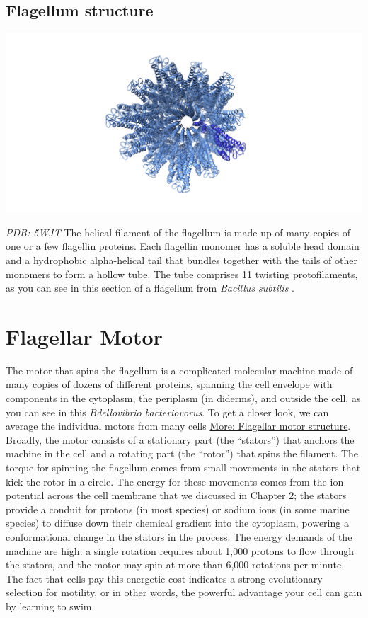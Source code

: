 \documentclass[]{tufte-book}
\begin{document}
\subsection{Flagellum structure}\label{Flagellum_structure}

\includegraphics{img/schematics/6_1_1}

\emph{PDB: 5WJT} The helical filament of the flagellum is made up of
many copies of one or a few flagellin proteins. Each flagellin monomer
has a soluble head domain and a hydrophobic alpha-helical tail that
bundles together with the tails of other monomers to form a hollow tube.
The tube comprises 11 twisting protofilaments, as you can see in this
section of a flagellum from \emph{Bacillus subtilis} \citep{wang2017}.

\section{Flagellar Motor}\label{flagellar-motor}

The motor that spins the flagellum is a complicated molecular machine
made of many copies of dozens of different proteins, spanning the cell
envelope with components in the cytoplasm, the periplasm (in diderms),
and outside the cell, as you can see in this \emph{Bdellovibrio
bacteriovorus}. To get a closer look, we can average the individual
motors from many cells
\protect\hyperlink{Flagellar_motor_structure}{More: Flagellar motor
structure}. Broadly, the motor consists of a stationary part (the
``stators'') that anchors the machine in the cell and a rotating part
(the ``rotor'') that spins the filament. The torque for spinning the
flagellum comes from small movements in the stators that kick the rotor
in a circle. The energy for these movements comes from the ion potential
across the cell membrane that we discussed in Chapter 2; the stators
provide a conduit for protons (in most species) or sodium ions (in some
marine species) to diffuse down their chemical gradient into the
cytoplasm, powering a conformational change in the stators in the
process. The energy demands of the machine are high: a single rotation
requires about 1,000 protons to flow through the stators, and the motor
may spin at more than 6,000 rotations per minute. The fact that cells
pay this energetic cost indicates a strong evolutionary selection for
motility, or in other words, the powerful advantage your cell can gain
by learning to swim.
\end{document}
